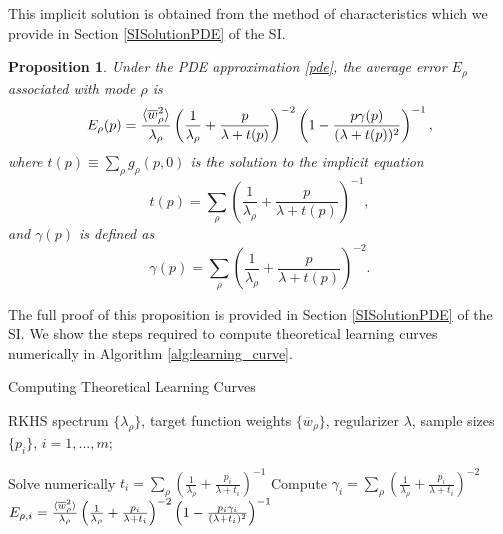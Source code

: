 \documentclass{article}
\newtheorem{proposition}{Proposition}
\begin{document}
This implicit solution is obtained from the method of characteristics which we provide in Section \ref{SISolutionPDE} of the SI. %

\begin{proposition}\label{prop3}
Under the PDE approximation \eqref{pde}, the average error $E_{\rho}$ associated with mode $\rho$ is 
\begin{equation}\label{modeError}
    E_\rho(p) = \frac{\braket{\overline{w}_\rho^2}}{\lambda_\rho}\left(\frac{1}{\lambda_\rho} + \frac{p}{\lambda+t(p)}\right)^{-2} \left(1 - \frac{p \gamma(p)}{(\lambda + t(p))^2}\right)^{-1},
\end{equation}
where $t(p)\equiv \sum_\rho g_\rho(p,0)$ is the solution to the implicit equation 
\begin{equation}\label{t_func}
    t(p) = \sum_\rho \left(\frac{1}{\lambda_\rho} + \frac{p}{\lambda+t(p)}\right)^{-1},
\end{equation}
and $\gamma(p)$ is defined as 
\begin{equation}
    \gamma(p) = \sum_\rho \left(\frac{1}{\lambda_\rho} + \frac{p}{\lambda+t(p)}\right)^{-2}.
\end{equation}
%
\end{proposition}

The full proof of this proposition is provided in Section \ref{SISolutionPDE} of the SI. We show the steps required to compute theoretical learning curves numerically in Algorithm \ref{alg:learning_curve}. 


\begin{algorithm}[h]
   \caption{Computing Theoretical Learning Curves}
   \label{alg:learning_curve}
\begin{algorithmic}
    RKHS spectrum $\{\lambda_\rho\}$, target function weights $\{\overline{w}_\rho\}$, regularizer $\lambda$, sample sizes $\{p_i\}$, $i=1,...,m$;%

   \STATE Solve numerically $t_i = \sum_\rho \left(\frac{1}{\lambda_\rho} + \frac{p_i}{\lambda + t_i}\right)^{-1}$
   \STATE Compute $\gamma_i = \sum_\rho \left(\frac{1}{\lambda_\rho} + \frac{p_i}{\lambda + t_i}\right)^{-2}$
   \STATE $E_{\rho,i} = \frac{\braket{\overline{w}_\rho^2}}{\lambda_\rho}  \left(\frac{1}{\lambda_\rho} + \frac{p_i}{\lambda + t_i}\right)^{-2} \left(  1 - \frac{p_i \gamma_i}{(\lambda+t_i)^2}  \right)^{-1}$
   \ENDFOR
\end{algorithmic}
\end{algorithm}
\end{document}
